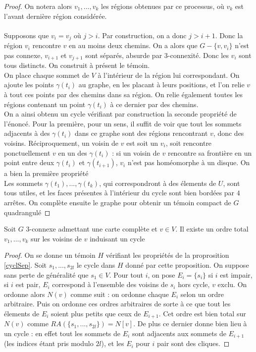 \documentclass{scrartcl}
\begin{document}
\begin{flushleft}
\begin{proof}
    On notera alors $v_1, ..., v_k$ les régions obtenues par ce processus, où $v_k$ est l'avant dernière région considérée.
    \\~\\
    Supposons que $v_i = v_j$ où $j > i$. Par construction, on a donc $j > i + 1$. Donc la région $v_i$ rencontre
    $v$ en au moins deux chemins. On a alors que $G - \{v, v_i\}$ n'est pas connexe, $v_{i+1}$ et $v_{j+1}$ sont séparés, absurde
    par $3$-connexité. Donc les $v_i$ sont tous distincts. On construit à présent le témoin.\\
    On place chaque sommet de $V$ à l'intérieur de la région lui correspondant. On ajoute les points $\gamma(t_i)$ au
    graphe, en les placant à leurs positions, et l'on relie $v$ à tout ces points par des chemins dans sa région. On relie
    également toutes les régions contenant un point $\gamma(t_i)$ à ce dernier par des chemins.\\
    On a ainsi obtenu un cycle vérifiant par construction la seconde propriété de l'énoncé. Pour la première, pour un sens,
    il suffit de voir que tout les sommets adjacents à des $\gamma(t_i)$ dans ce graphe sont des régions rencontrant $v$, donc des
    voisins. Réciproquement, un voisin de $v$ est soit un $v_i$, soit rencontre ponctuellement $v$ en un des $\gamma(t_i)$ : si un
    voisin de $v$ rencontre sa frontière en un point entre deux $\gamma(t_i)$ et $\gamma(t_{i+1})$, $v_i$ n'est pas homéomorphe à
    un disque. On a bien la première propriété\\
    Les sommets $\gamma(t_1), ..., \gamma(t_k)$, qui correspondront à des élements de $U$, sont tous utiles,
    et les faces présentes à l'intérieur du cycle sont bien bordées par $4$ arrêtes. On complète ensuite le graphe pour obtenir un
    témoin compact de $G$ quadrangulé
\end{proof}

\begin{cor}\label{ordCycl}
    Soit $G$ $3$-connexe admettant une carte complète et $v \in V$. Il existe un ordre total $v_1, ..., v_k$ sur les voisins de $v$
    induisant un cycle
\end{cor}

\begin{proof}
    On se donne un témoin $H$ vérifiant les propriétés de la proprosition \ref{cyclSep}. Soit $s_1, ..., s_{2l}$ le cycle dans $H$
    donné par cette proposition. On suppose sans perte de généralité que $s_1 \in V$. Pour tout $i$, on pose $E_i = \{s_i\}$
    si $i$ est impair, si $i$ est pair, $E_i$ correspond à l'ensemble des voisins de $s_i$ hors cycle, $v$ exclu. On ordonne alors $N(v)$
    comme suit : on ordonne chaque $E_i$ selon un ordre arbitraire. Puis on ordonne ces ordres arbitraires de sorte à ce que
    tout les élements de $E_i$ soient plus petits que ceux de $E_{i+1}$. Cet ordre est bien total sur $N(v)$
    comme $RA(\{s_1, ..., s_{2l}\}) = N[v]$. De plus ce dernier donne bien lieu à un cycle : en effet tout les sommets de $E_i$ sont
    adjacents aux sommets de $E_{i+1}$ (les indices étant pris modulo $2l$), et les $E_i$ pour $i$ pair sont des cliques.
\end{proof}


\end{flushleft}
\end{document}
